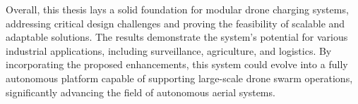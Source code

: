 Overall, this thesis lays a solid foundation for modular drone charging systems, addressing critical design challenges and proving the feasibility of scalable and adaptable solutions. The results demonstrate the system’s potential for various industrial applications, including surveillance, agriculture, and logistics. By incorporating the proposed enhancements, this system could evolve into a fully autonomous platform capable of supporting large-scale drone swarm operations, significantly advancing the field of autonomous aerial systems.